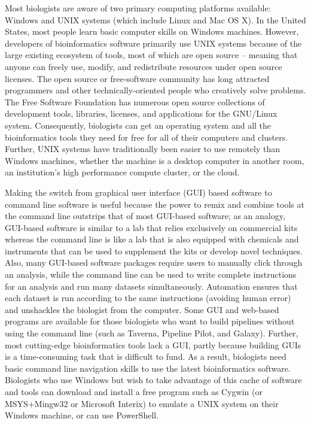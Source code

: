 \documentclass[ChapterTOCs,krantz2]{krantz} %
\newcommand{\unix}{UNIX}
\begin{document}
Most biologists are aware of two primary computing platforms available:
Windows and \unix{} systems (which include Linux and Mac OS X). 
In the United States, most people
learn basic computer skills on Windows machines.  
However, developers of bioinformatics
software primarily use \unix{} systems because of the large existing ecosystem
of tools, most of which are open source -- meaning that anyone can freely use, modify, and
redistribute resources under open source licenses.  The open source or 
free-software community has long attracted programmers and other 
technically-oriented people who creatively solve problems.
The Free Software Foundation\cite{FSF} has numerous 
open source collections of development
tools, libraries, licenses, and applications for the GNU/Linux system.
Consequently, biologists can get an operating system and all the bioinformatics
tools they need for free for all of their computers and clusters.  
Further, \unix{} systems have traditionally been easier to use remotely than Windows
machines, whether
the machine is a desktop computer 
in another room, an institution's high performance compute cluster, or 
the cloud.

Making the switch from graphical user interface (GUI) based software 
to command line software is useful because
the power to remix and combine tools at the command line outstrips that
of most GUI-based software; as an analogy, GUI-based software is similar to a lab
that relies exclusively on commercial kits whereas the command line 
is like a lab that is also equipped with chemicals and instruments that can be used 
to supplement the kits or develop novel techniques.  Also, many
GUI-based software packages require users to manually click through an analysis,
while the command line can be used to write complete instructions for an
analysis and run many datasets simultaneously.   Automation ensures 
that each dataset is run according to the
same instructions (avoiding human error) and unshackles the biologist from
the computer.  
Some GUI and web-based programs are available 
for those biologists who want to build pipelines without using 
the command line (such as Taverna, Pipeline Pilot, and Galaxy).  
Further, most
cutting-edge bioinformatics tools lack a GUI,
partly because building GUIs is a time-consuming task that is
difficult to fund.  As a result, biologists need
basic command line navigation skills to use the latest bioinformatics software.  Biologists
who use Windows but wish to take advantage of this cache of software and tools
can download and install a free program such as Cygwin (or MSYS+Mingw32 or 
Microsoft Interix) to emulate a \unix{} system
on their Windows machine, or can use PowerShell.
\end{document}
